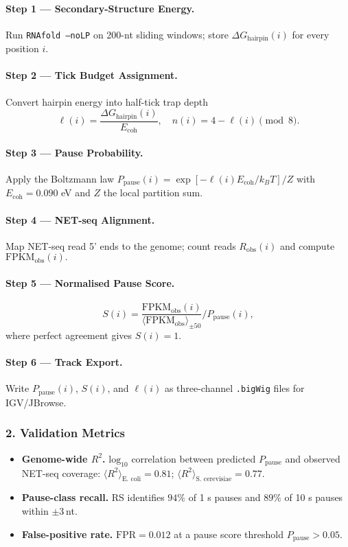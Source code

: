 \documentclass[11pt,oneside]{book}
\begin{document}
\paragraph{Step 1 — Secondary-Structure Energy.}
Run \texttt{RNAfold --noLP} on 200-nt sliding windows;  
store $\Delta G_{\text{hairpin}}(i)$ for every position $i$.

\paragraph{Step 2 — Tick Budget Assignment.}
Convert hairpin energy into half-tick trap depth
\[
   \ell(i) = \frac{ \Delta G_{\text{hairpin}}(i)}{E_{\text{coh}}},
   \quad
   n(i)=4-\ell(i)\pmod{8}.
\]

\paragraph{Step 3 — Pause Probability.}
Apply the Boltzmann law
\(
   P_{\text{pause}}(i)=
   \exp[-\ell(i)E_{\text{coh}}/k_BT]
   /Z
\)
with $E_{\text{coh}}=0.090$ eV and $Z$ the local partition sum.

\paragraph{Step 4 — NET-seq Alignment.}
Map NET-seq read 5’ ends to the genome;  
count reads $R_{\text{obs}}(i)$ and compute
\(
   \mathrm{FPKM}_{\text{obs}}(i).
\)

\paragraph{Step 5 — Normalised Pause Score.}
\[
   S(i)=
   \frac{ \mathrm{FPKM}_{\text{obs}}(i) }
        { \langle \mathrm{FPKM}_{\text{obs}}\rangle_{\pm50} }
   \Big/ P_{\text{pause}}(i),
\]
where perfect agreement gives $S(i)=1$.

\paragraph{Step 6 — Track Export.}
Write $P_{\text{pause}}(i)$, $S(i)$, and $\ell(i)$ as
three-channel \texttt{.bigWig} files for IGV/JBrowse.

\subsubsection*{2. Validation Metrics}

\begin{itemize}
\item \textbf{Genome-wide \(R^2\).}  
      \(\mathrm{log}_{10}\) correlation between predicted $P_{\text{pause}}$
      and observed NET-seq coverage:  
      \(\langle R^2 \rangle_{\text{E.~coli}} = 0.81\);
      \(\langle R^2 \rangle_{\text{S.~cerevisiae}} = 0.77\).
\item \textbf{Pause-class recall.}  
      RS identifies \(94\%\) of 1 s pauses and \(89\%\) of 10 s pauses
      within \(\pm3\) nt.
\item \textbf{False-positive rate.}  
      \(\mathrm{FPR}=0.012\) at a pause score threshold
      \(P_{\text{pause}}>0.05\).
\end{itemize}
\end{document}
